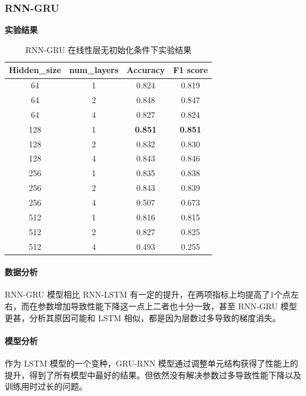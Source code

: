 \documentclass{article}
\begin{document}
\begin{spacing}{1.1}
		\subsubsection{RNN-GRU}
		\textbf{实验结果}
		
		\begin{table}[h]
			\center
			\begin{tabular}{c|c|c|c}
				\textbf{Hidden\_size} & \textbf{num\_layers} & \textbf{Accuracy} & \textbf{F1 score} \\
				\hline
				64 & 1 & 0.824 & 0.819 \\
				\hline
				64 & 2 & 0.848 & 0.847\\
				\hline
				64 & 4 & 0.827 & 0.824 \\
				\hline
				128 & 1 & \textbf{0.851} & \textbf{0.851} \\
				\hline
				128 & 2 & 0.832 & 0.830\\
				\hline
				128 & 4 & 0.843 & 0.846 \\
				\hline
				256 & 1 & 0.835 & 0.838 \\
				\hline
				256 & 2 & 0.843 & 0.839\\
				\hline
				256 & 4 & 0.507 & 0.673 \\
				\hline
				512 & 1 & 0.816 & 0.815 \\
				\hline
				512 & 2 & 0.827 & 0.825 \\
				\hline
				512 & 4 & 0.493 & 0.255 \\
			\end{tabular}
			\caption{RNN-GRU 在线性层无初始化条件下实验结果}
		\end{table}
		\paragraph*{数据分析}
		RNN-GRU 模型相比 RNN-LSTM 有一定的提升，在两项指标上均提高了1个点左右，而在参数增加导致性能下降这一点上二者也十分一致，甚至 RNN-GRU 模型更甚，分析其原因可能和 LSTM 相似，都是因为层数过多导致的梯度消失。
		\paragraph*{模型分析}
		作为 LSTM 模型的一个变种，GRU-RNN 模型通过调整单元结构获得了性能上的提升，得到了所有模型中最好的结果。但依然没有解决参数过多导致性能下降以及训练用时过长的问题。

\end{spacing}
\end{document}
